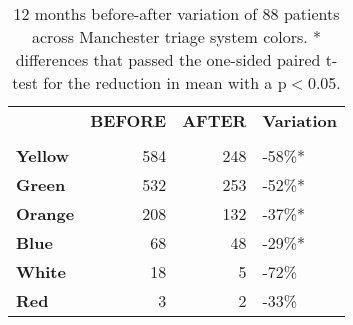 \documentclass{bmcart}
\begin{document}
\begin{table}
\caption{12 months before-after variation of 88 patients across Manchester triage system colors.  * differences that passed the one-sided paired t-test for the reduction in mean with a p$<$0.05.}
\centering
\begin{tabular}{lrrl}
\toprule
{} &  \textbf{BEFORE} &  \textbf{AFTER} & \textbf{Variation} \\
   &         &        &           \\
\midrule
\textbf{Yellow}   &     \hfil 584 &    \hfil 248 &      \hfil -58\%* \\
\textbf{Green}    &     \hfil 532 &    \hfil 253 &      \hfil -52\%* \\
\textbf{Orange}   &     \hfil 208 &    \hfil 132 &      \hfil -37\%* \\
\textbf{Blue}     &      \hfil 68 &     \hfil 48 &      \hfil -29\%* \\
\textbf{White}     &      \hfil 18 &      \hfil 5 &      \hfil -72\% \\
\textbf{Red}       &       \hfil 3 &      \hfil 2 &      \hfil -33\% \\
\bottomrule
\end{tabular}
\label{tab:er_color_12m}
\end{table}
\end{document}
